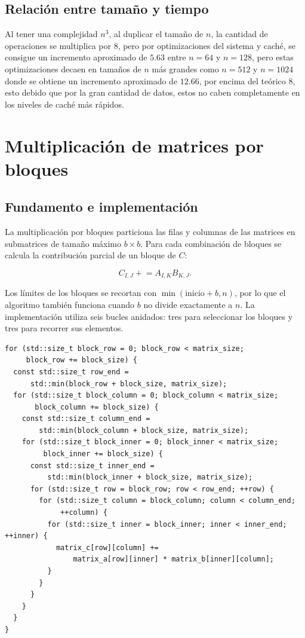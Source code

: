 \documentclass[a4paper,12pt]{article}
\begin{document}
\subsection{Relación entre tamaño y tiempo}

Al tener una complejidad $n^3$, al duplicar el tamaño de $n$, la cantidad de operaciones se multiplica por $8$, pero por optimizaciones del sistema y caché, se consigue un incremento aproximado de $5.63$ entre $n = 64$ y $n = 128$, pero estas optimizaciones decaen en tamaños de $n$ más grandes como $n=512$ y $n=1024$ donde se obtiene un incremento aproximado de $12.66$, por encima del teórico $8$, esto debido que por la gran cantidad de datos, estos no caben completamente en los niveles de caché más rápidos.

\section{Multiplicación de matrices por bloques}

\subsection{Fundamento e implementación}

La multiplicación por bloques particiona las filas y columnas de las matrices
en submatrices de tamaño máximo \(b\times b\). Para cada combinación de
bloques se calcula la contribución parcial de un bloque de \(C\):

\[
C_{I,J}\mathrel{+}=A_{I,K}B_{K,J}.
\]

Los límites de los bloques se recortan con
\(\min(\text{inicio}+b,n)\), por lo que el algoritmo también funciona cuando
\(b\) no divide exactamente a \(n\). La implementación utiliza seis bucles
anidados: tres para seleccionar los bloques y tres para recorrer sus elementos.

\begin{lstlisting}[caption={Seis bucles de la multiplicación por bloques}]
for (std::size_t block_row = 0; block_row < matrix_size;
     block_row += block_size) {
  const std::size_t row_end =
      std::min(block_row + block_size, matrix_size);
  for (std::size_t block_column = 0; block_column < matrix_size;
       block_column += block_size) {
    const std::size_t column_end =
        std::min(block_column + block_size, matrix_size);
    for (std::size_t block_inner = 0; block_inner < matrix_size;
         block_inner += block_size) {
      const std::size_t inner_end =
          std::min(block_inner + block_size, matrix_size);
      for (std::size_t row = block_row; row < row_end; ++row) {
        for (std::size_t column = block_column; column < column_end;
             ++column) {
          for (std::size_t inner = block_inner; inner < inner_end; ++inner) {
            matrix_c[row][column] +=
                matrix_a[row][inner] * matrix_b[inner][column];
          }
        }
      }
    }
  }
}
\end{lstlisting}
\end{document}
